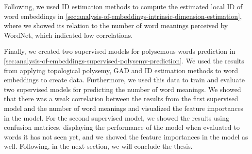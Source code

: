 Following, we used ID estimation methods to compute the estimated local ID of word embeddings in \cref{sec:analysis-of-embeddings-intrinsic-dimension-estimation}, where we showed its relation to the number of word meanings perceived by WordNet, which indicated low correlations.

Finally, we created two supervised models for polysemous words prediction in \cref{sec:analysis-of-embeddings-supervised-polysemy-prediction}. We used the results from applying topological polysemy, GAD and ID estimation methods to word embeddings to create data. Furthermore, we used this data to train and evaluate two supervised models for predicting the number of word meanings. We showed that there was a weak correlation between the results from the first supervised model and the number of word meanings and visualized the feature importances in the model. For the second supervised model, we showed the results using confusion matrices, displaying the performance of the model when evaluated to words it has not seen yet, and we showed the feature importances in the model as well. Following, in the next section, we will conclude the thesis.